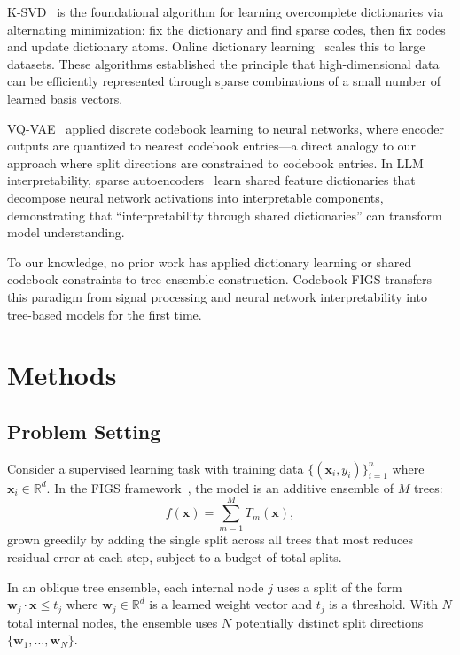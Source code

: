 \documentclass[11pt,letterpaper]{article}
\begin{document}
K-SVD~\citep{Aharon2006} is the foundational algorithm for learning overcomplete dictionaries via alternating minimization: fix the dictionary and find sparse codes, then fix codes and update dictionary atoms. Online dictionary learning~\citep{Mairal2009} scales this to large datasets. These algorithms established the principle that high-dimensional data can be efficiently represented through sparse combinations of a small number of learned basis vectors.

VQ-VAE~\citep{vandenOord2017} applied discrete codebook learning to neural networks, where encoder outputs are quantized to nearest codebook entries---a direct analogy to our approach where split directions are constrained to codebook entries. In LLM interpretability, sparse autoencoders~\citep{Cunningham2024} learn shared feature dictionaries that decompose neural network activations into interpretable components, demonstrating that ``interpretability through shared dictionaries'' can transform model understanding.

To our knowledge, no prior work has applied dictionary learning or shared codebook constraints to tree ensemble construction. Codebook-FIGS transfers this paradigm from signal processing and neural network interpretability into tree-based models for the first time.

\section{Methods}

\subsection{Problem Setting}

Consider a supervised learning task with training data $\{(\mathbf{x}_i, y_i)\}_{i=1}^{n}$ where $\mathbf{x}_i \in \mathbb{R}^d$. In the FIGS framework~\citep{Tan2022}, the model is an additive ensemble of $M$ trees:
\begin{equation}
f(\mathbf{x}) = \sum_{m=1}^{M} T_m(\mathbf{x}),
\end{equation}
grown greedily by adding the single split across all trees that most reduces residual error at each step, subject to a budget of total splits.

In an oblique tree ensemble, each internal node $j$ uses a split of the form $\mathbf{w}_j \cdot \mathbf{x} \leq t_j$ where $\mathbf{w}_j \in \mathbb{R}^d$ is a learned weight vector and $t_j$ is a threshold. With $N$ total internal nodes, the ensemble uses $N$ potentially distinct split directions $\{\mathbf{w}_1, \ldots, \mathbf{w}_N\}$.
\end{document}
